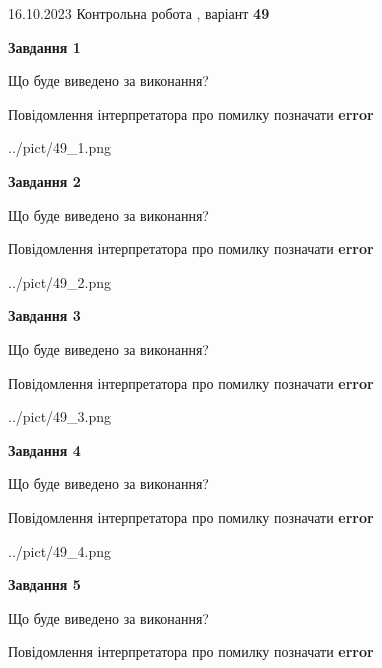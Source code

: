 \documentclass[12pt, ukrainian]{article}
\begin{document}
{\Large{16.10.2023 Контрольна робота , варіант  \No \textbf { 49 }\par}}
{
\begin {large}
{\begin {center}\textbf{Завдання 1}\end {center}}\par
Що буде виведено за виконання? \par
Повідомлення інтерпретатора про помилку позначати \textbf{error}

\begin{center}
	{../pict/49_1.png}
\end{center}
\newpage

{\begin {center}\textbf{Завдання 2}\end {center}}\par
Що буде виведено за виконання? \par
Повідомлення інтерпретатора про помилку позначати \textbf{error}

\begin{center}
	{../pict/49_2.png}
\end{center}
\newpage

{\begin {center}\textbf{Завдання 3}\end {center}}\par
Що буде виведено за виконання? \par
Повідомлення інтерпретатора про помилку позначати \textbf{error}

\begin{center}
	{../pict/49_3.png}
\end{center}
\newpage

{\begin {center}\textbf{Завдання 4}\end {center}}\par
Що буде виведено за виконання? \par
Повідомлення інтерпретатора про помилку позначати \textbf{error}

\begin{center}
	{../pict/49_4.png}
\end{center}
\newpage

{\begin {center}\textbf{Завдання 5}\end {center}}\par
Що буде виведено за виконання? \par
Повідомлення інтерпретатора про помилку позначати \textbf{error}


\end{large}}
\end{document}
